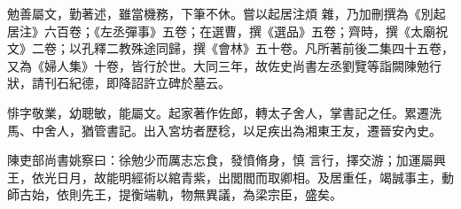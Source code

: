 \begin{pinyinscope}
 勉善屬文，勤著述，雖當機務，下筆不休。嘗以起居注煩
 雜，乃加刪撰為《別起居注》六百卷；《左丞彈事》五卷；在選曹，撰《選品》五卷；齊時，撰《太廟祝文》二卷；以孔釋二教殊途同歸，撰《會林》五十卷。凡所著前後二集四十五卷，又為《婦人集》十卷，皆行於世。大同三年，故佐史尚書左丞劉覽等詣闕陳勉行狀，請刊石紀德，即降詔許立碑於墓云。



 悱字敬業，幼聰敏，能屬文。起家著作佐郎，轉太子舍人，掌書記之任。累遷洗馬、中舍人，猶管書記。出入宮坊者歷稔，以足疾出為湘東王友，遷晉安內史。



 陳吏部尚書姚察曰：徐勉少而厲志忘食，發憤脩身，慎
 言行，擇交游；加運屬興王，依光日月，故能明經術以綰青紫，出閭閻而取卿相。及居重任，竭誠事主，動師古始，依則先王，提衡端軌，物無異議，為梁宗臣，盛矣。



\end{pinyinscope}